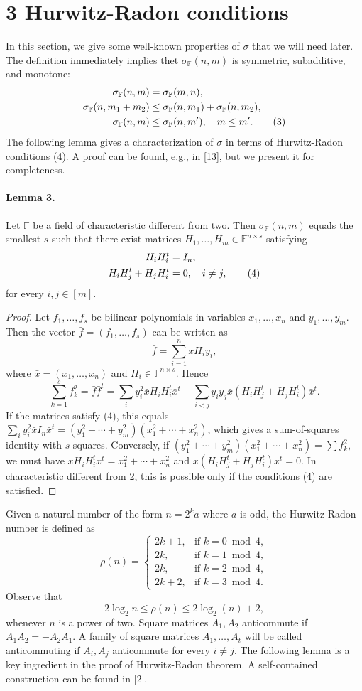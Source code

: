 \documentclass[10pt,a4paper]{article}
\begin{document}
\section*{3 Hurwitz-Radon conditions}
In this section, we give some well-known properties of $\sigma$ that we will need later.
The definition immediately implies thet $\sigma_{\mathbb F}(n,m)$ is symmetric, subadditive, and monotone:
\begin{align}
\sigma_{\mathbb F}(n,m)&=\sigma_{\mathbb F}(m,n),\notag\\
\sigma_{\mathbb F}(n,m_1+m_2)&\le\sigma_{\mathbb F}(n,m_1)+\sigma_{\mathbb F}(n,m_2),\notag\\
\sigma_{\mathbb F}(n,m)&\le\sigma_{\mathbb F}(n,m'),\quad m\le m'.\tag{3}
\end{align}
The following lemma gives a characterization of $\sigma$ in terms of Hurwitz-Radon conditions (4). A proof can be found, e.g., in [13], but we present it for completeness.
\paragraph{Lemma 3.} Let $\mathbb F$ be a field of characteristic different from two. Then $\sigma_{\mathbb F}(n,m)$ equals the smallest $s$ such that there exist matrices $H_1,\ldots,H_m\in\mathbb F^{n\times s}$ satisfying
\begin{align}
H_iH_i^t&=I_n,\notag\\
H_iH_j^t+H_jH_i^t&=0,\quad i\ne j,\tag{4}
\end{align}
for every $i,j\in[m]$.
\begin{proof}
Let $f_1,\ldots,f_s$ be bilinear polynomials in variables $x_1,\ldots,x_n$ and $y_1,\ldots,y_m$. Then the vector $\bar f=(f_1,\ldots,f_s)$ can be written as
\[\bar f=\sum_{i=1}^n\bar xH_i y_i,\]
where $\bar x=(x_1,\ldots,x_n)$ and $H_i\in\mathbb F^{n\times s}$. Hence
\[\sum_{k=1}^s f_k^2=\bar f\bar f^t=\sum_i y_i^2\bar xH_iH_i^t\bar x^t+\sum_{i<j}y_i y_j\bar x(H_iH_j^t+H_jH_i^t)\bar x^t.\]
If the matrices satisfy (4), this equals $\sum_i y_i^2\bar xI_n\bar x^t=(y_1^2+\cdots+y_m^2)(x_1^2+\cdots+x_n^2)$, which gives a sum-of-squares identity with $s$ squares. Conversely, if $(y_1^2+\cdots+y_m^2)(x_1^2+\cdots+x_n^2)=\sum f_k^2$, we must have $\bar xH_iH_i^t\bar x^t=x_1^2+\cdots+x_n^2$ and $\bar x(H_iH_j^t+H_jH_i^t)\bar x^t=0$. In characteristic different from 2, this is possible only if the conditions (4) are satisfied.
\end{proof}
Given a natural number of the form $n=2^k a$ where $a$ is odd, the Hurwitz-Radon number is defined as
\[\rho(n)=\begin{cases}2k+1,&\text{if }k=0\bmod4,\\2k,&\text{if }k=1\bmod4,\\2k,&\text{if }k=2\bmod4,\\2k+2,&\text{if }k=3\bmod4.\end{cases}\]
Observe that
\[2\log_2n\le\rho(n)\le2\log_2(n)+2,\]
whenever $n$ is a power of two.
Square matrices $A_1,A_2$ anticommute if $A_1A_2=-A_2A_1$. A family of square matrices $A_1,\ldots,A_t$ will be called anticommuting if $A_i,A_j$ anticommute for every $i\ne j$.
The following lemma is a key ingredient in the proof of Hurwitz-Radon theorem. A self-contained construction can be found in [2].
\end{document}
